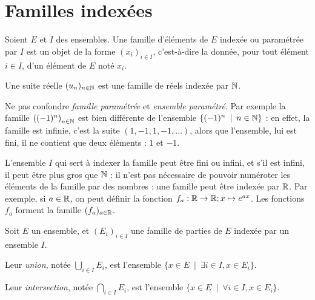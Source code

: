 \section{Familles indexées}

\begin{definition}
Soient $E$ et $I$ des ensembles. Une famille d'éléments de $E$ indexée ou paramétrée par $I$ est un objet de la forme $(x_i)_{i\in I}$, c'est-à-dire la donnée, pour tout élément $i\in I$, d'un élément de $E$ noté $x_i$.
\end{definition}

\begin{exemple}
Une suite réelle $(u_n)_{n\in \mathbb{N}}$ est une famille de réels indexée par $\mathbb{N}$.
\end{exemple}

\begin{attention}
Ne pas confondre \emph{famille paramétrée} et \emph{ensemble paramétré}. Par exemple la famille $\left( (-1)^n \right)_{n\in \mathbb{N}}$ est bien différente de l'ensemble $\left\{(-1)^n\:\mid\:n\in \N\right\}$ : en effet, la famille est infinie, c'est la suite $(1,-1, 1,-1, \dots)$, alors que l'ensemble, lui est fini, il ne contient que deux éléments : $1$ et $-1$.
\end{attention}

L'ensemble $I$ qui sert à indexer la famille peut être fini ou infini, et s'il est infini, il peut être plus gros que $\mathbb{N}$ : il n'est pas nécessaire de pouvoir numéroter les éléments de la famille par des nombres : une famille peut être indexée par $\mathbb{R}$. Par exemple, si $a\in \mathbb{R}$, on peut définir la fonction $f_a : \mathbb{R}\to \mathbb{R}; x\mapsto e^{ax}$. Les fonctions $f_a$ forment la famille $(f_a)_{a\in \mathbb{R}}$.


\begin{definition}
Soit $E$ un ensemble, et $(E_i)_{i\in I}$ une famille de parties de $E$ indexée par un ensemble $I$.

Leur \emph{union}, notée $\bigcup_{i\in I} E_i$, est l'ensemble $\{x\in E\:\mid\: \exists i\in I, x\in E_i\}$.

Leur \emph{intersection}, notée $\bigcap_{i\in I} E_i$, est l'ensemble $\{x\in E\:\mid\: \forall i\in I, x\in E_i\}$.
\end{definition}



